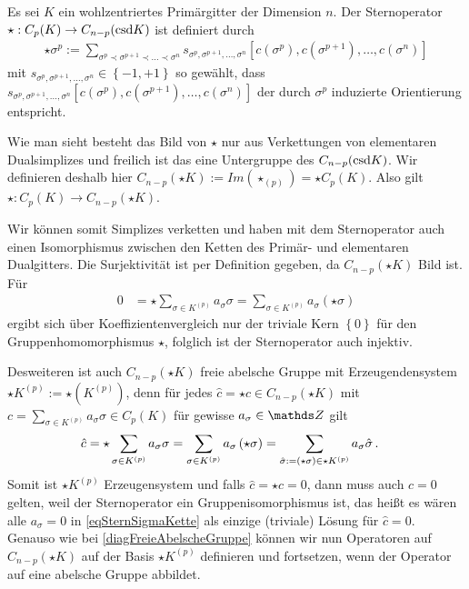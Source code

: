   \begin{definition}
     Es sei \( K \) ein wohlzentriertes Primärgitter der Dimension \( n \).
     Der Sternoperator \( \star: C_{p}(K) \rightarrow   C_{n-p}(\text{csd} K) \) ist definiert durch
     \begin{align}
       \star\sigma^{p} := \sum_{\sigma^{p} \prec \sigma^{p+1} \prec \ldots \prec \sigma^{n}}
                                                   s_{\sigma^{p}, \sigma^{p+1}, \ldots, \sigma^{n}} \left[ c(\sigma^{p}), c(\sigma^{p+1}), \ldots, c(\sigma^{n}) \right]
     \end{align}
     mit \( s_{\sigma^{p}, \sigma^{p+1}, \ldots, \sigma^{n}} \in \left\{ -1,+1 \right\}\) so gewählt, dass  
     \( s_{\sigma^{p}, \sigma^{p+1}, \ldots, \sigma^{n}} \left[ c(\sigma^{p}), c(\sigma^{p+1}), \ldots, c(\sigma^{n}) \right] \) der
     durch \( \sigma^{p} \) induzierte Orientierung entspricht.
  \end{definition}
  Wie man sieht besteht das Bild von \( \star \) nur aus Verkettungen von elementaren Dualsimplizes und freilich ist das eine Untergruppe des \( C_{n-p}(\text{csd} K) \).
  Wir definieren deshalb hier \( C_{n-p}(\star K) := Im(\star_{(p)}) = \star C_{p}(K) \).
  Also gilt \( \star: C_{p}(K) \rightarrow   C_{n-p}(\star K) \).

  Wir können somit Simplizes verketten und haben mit dem Sternoperator auch einen Isomorphismus
  zwischen den Ketten des Primär- und elementaren Dualgitters.
  Die Surjektivität ist per Definition gegeben, da \( C_{n-p}(\star K) \) Bild ist.
  Für
  \begin{align}
    0 &= \star \sum_{\sigma \in K^{(p)}} a_{\sigma}\sigma = \sum_{\sigma \in K^{(p)}} a_{\sigma} \left( \star\sigma\right)
  \end{align}
  ergibt sich über Koeffizientenvergleich nur der triviale Kern \( \left\{ 0 \right\} \) für den Gruppenhomomorphismus \( \star \), 
  folglich ist der Sternoperator auch injektiv.
  
  Desweiteren ist auch \( C_{n-p}(\star K) \) freie abelsche Gruppe mit Erzeugendensystem \( \star K^{(p)} := \star\left( K^{(p)} \right) \), 
  denn für jedes \( \hat{c} = \star c \in C_{n-p}(\star K) \) mit \( c = \sum_{\sigma \in K^{(p)}} a_{\sigma}\sigma \in C_{p}(K) \) für gewisse \( a_{\sigma} \in \Z \) gilt
  \begin{align}
    \label{eqSternSigmaKette}
    \hat{c} &= \star \sum_{\sigma \in K^{(p)}} a_{\sigma}\sigma
             = \sum_{\sigma \in K^{(p)}} a_{\sigma} \left( \star\sigma\right)
             = \sum_{\hat{\sigma}:=\left( \star\sigma\right) \in \star K^{(p)} } a_{\sigma} \hat{\sigma} \,\text{.}
  \end{align}
  Somit ist \(\star K^{(p)}  \) Erzeugensystem und falls \( \hat{c} = \star c = 0 \), dann muss auch \( c = 0 \) gelten, weil der Sternoperator ein Gruppenisomorphismus ist,
  das heißt es wären alle \( a_{\sigma} = 0 \) in \eqref{eqSternSigmaKette} als einzige (triviale) Lösung für \( \hat{c} = 0 \).
  Genauso wie bei \eqref{diagFreieAbelscheGruppe} können wir nun Operatoren auf \( C_{n-p}(\star K) \) auf der Basis \( \star K^{(p)} \) definieren und fortsetzen, 
  wenn der Operator auf eine abelsche Gruppe abbildet.

